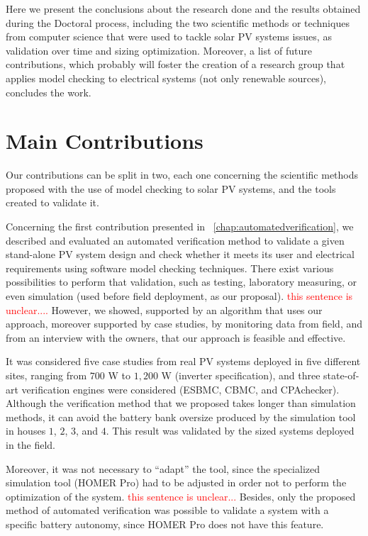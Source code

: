 Here we present the conclusions about the research done and the results obtained during the Doctoral process, including the two scientific methods or techniques from computer science that were used to tackle solar PV systems issues, as validation over time and sizing optimization. Moreover, a list of future contributions, which probably will foster the creation of a research group that applies model checking to electrical systems (not only renewable sources), concludes the work.

\section{Main Contributions}

Our contributions can be split in two, each one concerning the scientific methods proposed with the use of model checking to solar PV systems, and the tools created to validate it.

Concerning the first contribution presented in ~\autoref{chap:automatedverification}, we described and evaluated an automated verification method to validate a given stand-alone PV system design and check whether it meets its user and electrical requirements using software model checking techniques.  There exist various possibilities to perform that validation, such as testing, laboratory measuring, or even simulation (used before field deployment, as our proposal). \textcolor{red}{this sentence is unclear....} However, we showed, supported by an algorithm that uses our approach, moreover supported by case studies, by monitoring data from field, and from an interview with the owners, that our approach is feasible and effective.

It was considered five case studies from real PV systems deployed in five different sites, ranging from $700$ W to $1,200$ W (inverter specification), and three state-of-art verification engines were considered (ESBMC, CBMC, and CPAchecker). Although the verification method that we proposed takes longer than simulation methods, it can avoid the battery bank oversize produced by the simulation tool in houses $1$, $2$, $3$, and $4$. This result was validated by the sized systems deployed in the field.

Moreover, it was not necessary to ``adapt'' the tool, since the specialized simulation tool (HOMER Pro) had to be adjusted in order not to perform the optimization of the system. \textcolor{red}{this sentence is unclear...} Besides, only the proposed method of automated verification was possible to validate a system with a specific battery autonomy, since HOMER Pro does not have this feature.

